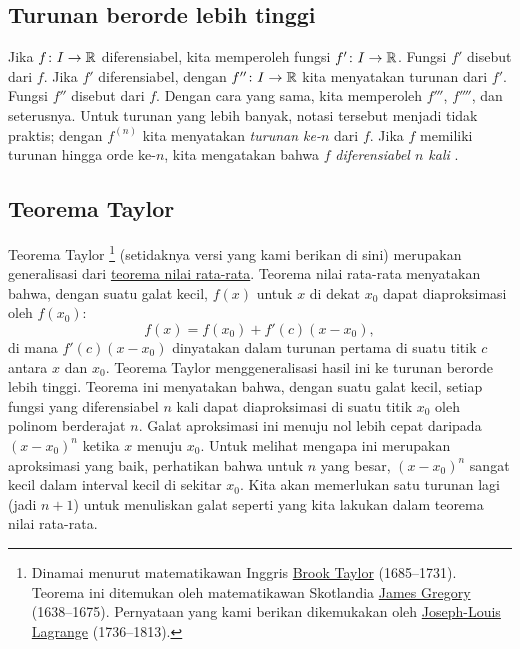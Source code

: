 

\subsection{Turunan berorde lebih tinggi}

Jika $f \colon I \to {\mathbb{R}}$ diferensiabel, kita memperoleh fungsi
$f' \colon I \to {\mathbb{R}}$.  Fungsi
$f'$ disebut \emph{} dari $f$.
Jika $f'$ diferensiabel, dengan
$f'' \colon I \to {\mathbb{R}}$ kita menyatakan turunan dari $f'$.  Fungsi $f''$
disebut \emph{} dari $f$.
Dengan cara yang sama, kita memperoleh
$f'''$, $f''''$, dan seterusnya.
Untuk turunan yang lebih banyak,
notasi tersebut menjadi tidak praktis; dengan
$f^{(n)}$ kita menyatakan
\emph{turunan ke-$n$} dari $f$.
%
Jika $f$ memiliki turunan hingga orde ke-$n$, kita mengatakan bahwa $f$
\emph{diferensiabel $n$ kali}
.

\subsection{Teorema Taylor}

Teorema Taylor%
\footnote{Dinamai menurut matematikawan Inggris
\href{https://en.wikipedia.org/wiki/Brook_Taylor}{Brook Taylor}
(1685--1731).
Teorema ini ditemukan oleh
matematikawan Skotlandia
\href{https://en.wikipedia.org/wiki/James_Gregory_(mathematician)}{James Gregory}
(1638--1675).  Pernyataan yang kami berikan
dikemukakan oleh
\href{https://en.wikipedia.org/wiki/Lagrange}{Joseph-Louis Lagrange}
(1736--1813).} (setidaknya versi yang kami berikan di sini)
merupakan generalisasi dari \hyperref[thm:mvt]{teorema nilai rata-rata}.
Teorema nilai rata-rata menyatakan bahwa, dengan suatu galat kecil, $f(x)$ untuk $x$ di dekat $x_0$ dapat
diaproksimasi oleh $f(x_0)$:
\begin{equation*}
f(x) = f(x_0) + f'(c)(x-x_0),
\end{equation*}
di mana  $f'(c)(x-x_0)$
dinyatakan dalam turunan pertama
di suatu titik $c$ antara $x$ dan $x_0$.
Teorema Taylor menggeneralisasi hasil ini ke turunan berorde lebih tinggi.
Teorema ini menyatakan bahwa, dengan suatu galat kecil, setiap fungsi yang
diferensiabel $n$ kali dapat diaproksimasi di suatu titik $x_0$
oleh polinom berderajat $n$.  Galat
aproksimasi ini menuju nol lebih cepat daripada ${(x-x_0)}^{n}$ ketika
$x$ menuju $x_0$.
Untuk melihat mengapa ini merupakan aproksimasi yang baik, perhatikan bahwa untuk $n$ yang besar, 
${(x-x_0)}^n$ sangat kecil dalam interval kecil di sekitar $x_0$.
Kita akan memerlukan satu turunan lagi (jadi $n+1$) untuk menuliskan galat
seperti yang kita lakukan dalam teorema nilai rata-rata.

